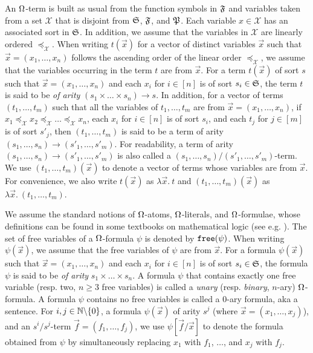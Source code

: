 An $\Omega$-term is built as usual from the function symbols in ${\mathfrak{F}}$ and variables taken from a set $\mathcal{X}$ that is disjoint from ${\mathfrak{S}}$, ${\mathfrak{F}}$, and ${\mathfrak{P}}$. Each variable $x \in \mathcal{X}$ has an associated sort in ${\mathfrak{S}}$. In addition, we assume that the variables in $\mathcal{X}$ are linearly ordered $\preceq_{\mathcal{X}}$. When writing $t(\vec{x})$ for a vector of distinct variables $\vec{x}$ such that $\vec{x} = (x_1,\dots, x_n)$ follows the ascending order of the linear order $\preceq_{\mathcal{X}}$, we assume that the variables occurring in the term $t$ are from $\vec{x}$. For a term $t(\vec{x})$ of sort $s$ such that $\vec{x} = (x_1, \dots, x_n)$ and each $x_i$ for $i \in [n]$ is of sort $s_i \in {\mathfrak{S}}$, the term $t$ is said to be \emph{of arity} $(s_1 \times \dots \times s_n) \rightarrow s$. In addition, for a vector of terms $(t_1, \dots, t_m)$ such that all the variables of $t_1 ,\dots, t_m$ are from $\vec{x} = (x_1, \dots, x_n)$, if $x_1 \preceq_{\mathcal{X}} x_2  \preceq_{\mathcal{X}} \dots  \preceq_{\mathcal{X}} x_n$, each $x_i$ for $i \in [n]$ is of sort $s_i$, and each $t_j$ for $j \in [m]$ is of sort $s'_j$, then $(t_1,\dots, t_m)$ is said to be a term of arity $(s_1,\dots, s_n) \rightarrow (s'_1,\dots, s'_m)$. For readability, a term of arity $(s_1,\dots, s_n) \rightarrow (s'_1,\dots, s'_m)$ is also called a $(s_1,\dots, s_n) \big/ (s'_1,\dots, s'_m)$-term. We use $(t_1,\dots, t_m)(\vec{x})$ to denote a vector of terms whose variables are from $\vec{x}$.  For convenience, we also write $t(\vec{x})$ as $\lambda \vec{x}.\ t$ and $(t_1,\dots, t_m)(\vec{x})$ as $\lambda \vec{x}.\ (t_1,\dots, t_m)$. 

We assume the standard notions of $\Omega$-atoms, $\Omega$-literals, and $\Omega$-formulae, whose definitions can be found in some textbooks on mathematical logic (see e.g. \cite{Gal85}). The set of free variables of a $\Omega$-formula $\psi$ is denoted by $\mathtt{free} (\psi)$. When writing $\psi(\vec{x})$, we assume that the free variables of $\psi$ are from $\vec{x}$. For a formula  $\psi(\vec{x})$ such that $\vec{x} = (x_1, \dots, x_n)$ and each $x_i$ for $i \in [n]$ is of sort $s_i \in {\mathfrak{S}}$, the formula $\psi$ is said to be \emph{of arity} $s_1 \times \dots \times s_n$.
A formula $\psi$ that contains exactly one free variable (resp. two, $n \ge 3$ free variables) is called a \emph{unary} (resp. \emph{binary}, $n$-ary) $\Omega$-formula. A formula $\psi$ contains no free variables is called a $0$-ary formula, aka a sentence. For $i, j \in \mathbb{N} \backslash \{0\}$, a formula $\psi(\vec{x})$ of arity $s^j$ (where $\vec{x}=(x_1, \dots, x_j)$), and an $s^i/s^j$-term $\vec{f}=(f_1,\dots, f_j)$, we use $\psi[\vec{f}/\vec{x}]$ to denote the formula obtained from $\psi$ by simultaneously replacing $x_1$ with $f_1$, $\dots$, and $x_j$ with $f_j$.

